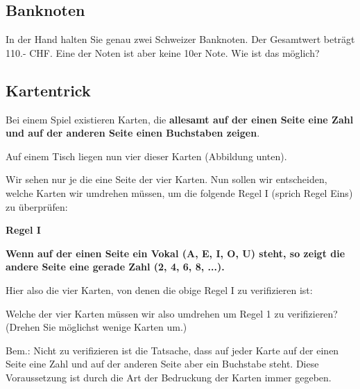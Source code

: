 \subsection{Banknoten}
In der Hand halten Sie genau zwei Schweizer Banknoten. Der Gesamtwert
beträgt 110.- CHF. Eine der Noten ist aber keine
10er Note. Wie ist das
möglich?

\TNTeop{}

\subsection{Kartentrick}

Bei einem Spiel existieren Karten, die \textbf{allesamt auf der einen Seite eine Zahl
und auf der anderen Seite einen Buchstaben zeigen}.

Auf einem Tisch liegen nun vier dieser Karten (Abbildung unten).

Wir sehen nur je die eine Seite der vier Karten. Nun sollen wir entscheiden,
welche Karten wir umdrehen müssen, um die folgende Regel I (sprich Regel
Eins) zu überprüfen:

\begin{center}\textbf{Regel I}\end{center}

\begin{center}\textbf{Wenn auf der einen Seite ein Vokal (A, E, I, O, U) steht,
so zeigt die andere Seite eine gerade Zahl (2, 4, 6, 8, ...).}
\end{center}

Hier also die vier Karten, von denen die obige Regel I zu verifizieren ist:


Welche der vier Karten müssen wir also umdrehen um Regel 1 zu verifizieren?
(Drehen Sie möglichst wenige Karten um.)

Bem.: Nicht zu verifizieren ist die Tatsache, dass auf jeder Karte auf der einen
Seite eine Zahl und auf der anderen Seite aber ein Buchstabe steht. Diese
Voraussetzung ist durch die Art der Bedruckung der Karten immer gegeben.


\TNTeop{}


